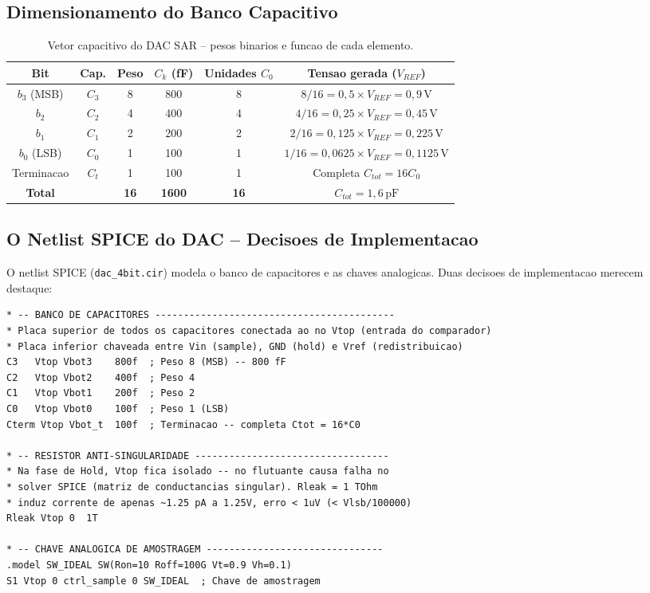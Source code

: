 \documentclass[12pt, a4paper]{article}
\begin{document}
\subsection{Dimensionamento do Banco Capacitivo}

\begin{table}[H]
\centering
\caption{Vetor capacitivo do DAC SAR -- pesos binarios e funcao de cada elemento.}
\label{tab:cap_array}
\begin{tabular}{cccccc}
\toprule
\textbf{Bit} & \textbf{Cap.} & \textbf{Peso} & $C_k$ (fF) & \textbf{Unidades $C_0$} & \textbf{Tensao gerada ($V_{REF}$)}\\
\midrule
$b_3$ (MSB) & $C_3$ & 8  & 800 & 8  & $8/16 = 0{,}5 \times V_{REF} = 0{,}9\,\text{V}$ \\
$b_2$       & $C_2$ & 4  & 400 & 4  & $4/16 = 0{,}25 \times V_{REF} = 0{,}45\,\text{V}$ \\
$b_1$       & $C_1$ & 2  & 200 & 2  & $2/16 = 0{,}125 \times V_{REF} = 0{,}225\,\text{V}$ \\
$b_0$ (LSB) & $C_0$ & 1  & 100 & 1  & $1/16 = 0{,}0625 \times V_{REF} = 0{,}1125\,\text{V}$ \\
Terminacao  & $C_t$ & 1  & 100 & 1  & Completa $C_{tot} = 16C_0$ \\
\midrule
\textbf{Total} & & \textbf{16} & \textbf{1600} & \textbf{16} & $C_{tot} = 1{,}6\,\text{pF}$ \\
\bottomrule
\end{tabular}
\end{table}

\subsection{O Netlist SPICE do DAC -- Decisoes de Implementacao}

O netlist SPICE (\texttt{dac\_4bit.cir}) modela o banco de capacitores e as chaves analogicas.
Duas decisoes de implementacao merecem destaque:

\begin{lstlisting}[caption={Trecho do netlist SPICE do DAC -- banco de capacitores e resistor anti-singularidade (dac\_4bit.cir).}]
* -- BANCO DE CAPACITORES ------------------------------------------
* Placa superior de todos os capacitores conectada ao no Vtop (entrada do comparador)
* Placa inferior chaveada entre Vin (sample), GND (hold) e Vref (redistribuicao)
C3   Vtop Vbot3    800f  ; Peso 8 (MSB) -- 800 fF
C2   Vtop Vbot2    400f  ; Peso 4
C1   Vtop Vbot1    200f  ; Peso 2
C0   Vtop Vbot0    100f  ; Peso 1 (LSB)
Cterm Vtop Vbot_t  100f  ; Terminacao -- completa Ctot = 16*C0

* -- RESISTOR ANTI-SINGULARIDADE ----------------------------------
* Na fase de Hold, Vtop fica isolado -- no flutuante causa falha no
* solver SPICE (matriz de conductancias singular). Rleak = 1 TOhm
* induz corrente de apenas ~1.25 pA a 1.25V, erro < 1uV (< Vlsb/100000)
Rleak Vtop 0  1T

* -- CHAVE ANALOGICA DE AMOSTRAGEM -------------------------------
.model SW_IDEAL SW(Ron=10 Roff=100G Vt=0.9 Vh=0.1)
S1 Vtop 0 ctrl_sample 0 SW_IDEAL  ; Chave de amostragem
\end{lstlisting}
\end{document}
